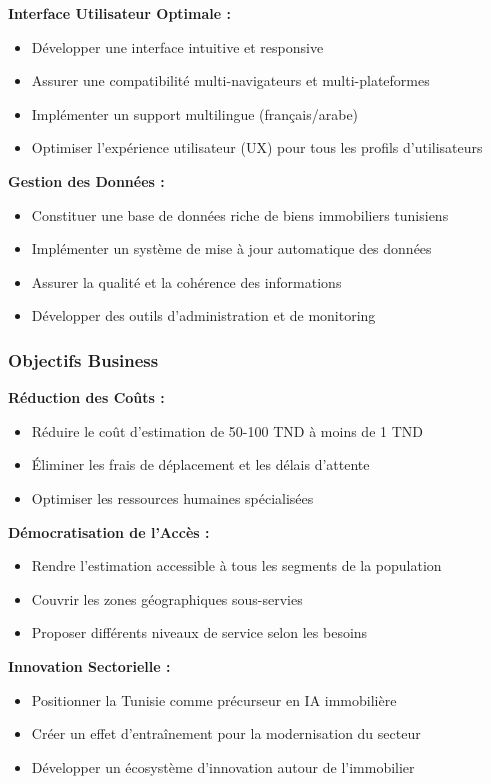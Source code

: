 \textbf{Interface Utilisateur Optimale :}
\begin{itemize}
    \item Développer une interface intuitive et responsive
    \item Assurer une compatibilité multi-navigateurs et multi-plateformes
    \item Implémenter un support multilingue (français/arabe)
    \item Optimiser l'expérience utilisateur (UX) pour tous les profils d'utilisateurs
\end{itemize}

\textbf{Gestion des Données :}
\begin{itemize}
    \item Constituer une base de données riche de biens immobiliers tunisiens
    \item Implémenter un système de mise à jour automatique des données
    \item Assurer la qualité et la cohérence des informations
    \item Développer des outils d'administration et de monitoring
\end{itemize}

\subsubsection{Objectifs Business}

\textbf{Réduction des Coûts :}
\begin{itemize}
    \item Réduire le coût d'estimation de 50-100 TND à moins de 1 TND
    \item Éliminer les frais de déplacement et les délais d'attente
    \item Optimiser les ressources humaines spécialisées
\end{itemize}

\textbf{Démocratisation de l'Accès :}
\begin{itemize}
    \item Rendre l'estimation accessible à tous les segments de la population
    \item Couvrir les zones géographiques sous-servies
    \item Proposer différents niveaux de service selon les besoins
\end{itemize}

\textbf{Innovation Sectorielle :}
\begin{itemize}
    \item Positionner la Tunisie comme précurseur en IA immobilière
    \item Créer un effet d'entraînement pour la modernisation du secteur
    \item Développer un écosystème d'innovation autour de l'immobilier
\end{itemize}

